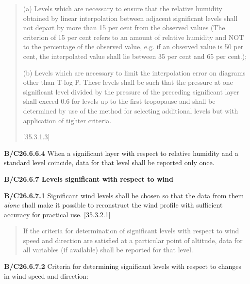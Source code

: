 \begin{quote}
(a) Levels which are necessary to ensure that the relative humidity obtained by linear interpolation between adjacent significant levels shall not depart by more than 15 per cent from the observed values (The criterion of 15 per cent refers to an amount of relative humidity and NOT to the percentage of the observed value, e.g. if an observed value is 50 per cent, the interpolated value shall lie between 35 per cent and 65 per cent.);

(b) Levels which are necessary to limit the interpolation error on diagrams other than T-log P. These levels shall be such that the pressure at one significant level divided by the pressure of the preceding significant layer shall exceed 0.6 for levels up to the first tropopause and shall be determined by use of the method for selecting additional levels but with application of tighter criteria.

{[}35.3.1.3{]}
\end{quote}

\textbf{B/C26.6.6.4} When a significant layer with respect to relative humidity and a standard level coincide, data for that level shall be reported only once.

\textbf{B/C26.6.7 Levels significant with respect to wind}

\textbf{B/C26.6.7.1} Significant wind levels shall be chosen so that the data from them \emph{alone} shall make it possible to reconstruct the wind profile with sufficient accuracy for practical use. {[}35.3.2.1{]}

\begin{quote}
If the criteria for determination of significant levels with respect to wind speed and direction are satisfied at a particular point of altitude, data for all variables (if available) shall be reported for that level.
\end{quote}

\textbf{B/C26.6.7.2} Criteria for determining significant levels with respect to changes in wind speed and direction:

